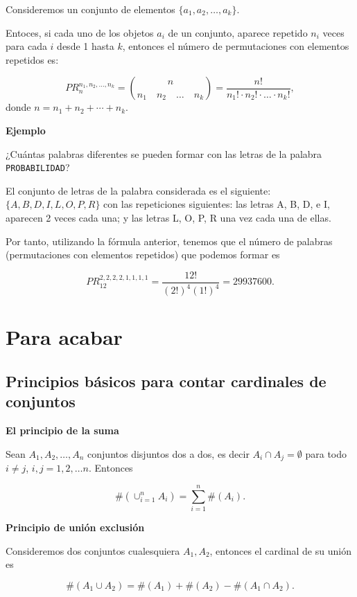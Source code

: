 \documentclass[
  letterpaper,
  DIV=11,
  numbers=noendperiod]{scrreprt}
\begin{document}
Consideremos un conjunto de elementos \(\{a_1, a_2, \ldots, a_k\}\).

Entoces, si cada uno de los objetos \(a_i\) de un conjunto, aparece
repetido \(n_i\) veces para cada \(i\) desde 1 hasta \(k\), entonces el
número de permutaciones con elementos repetidos es:

\[PR_n^{n_1,n_2,\ldots,n_k} = {{n}\choose {n_1\quad n_2 \quad\ldots \quad n_k}}=\frac{n!}{n_1!\cdot n_2!\cdot \ldots \cdot n_k!},\]
donde \(n=n_1+n_2+\cdots+n_k\).

\textbf{Ejemplo}

¿Cuántas palabras diferentes se pueden formar con las letras de la
palabra \texttt{PROBABILIDAD}?

El conjunto de letras de la palabra considerada es el siguiente:
\(\{A, B, D, I, L, O, P, R\}\) con las repeticiones siguientes: las
letras A, B, D, e I, aparecen 2 veces cada una; y las letras L, O, P, R
una vez cada una de ellas.

Por tanto, utilizando la fórmula anterior, tenemos que el número de
palabras (permutaciones con elementos repetidos) que podemos formar es

\[PR^{2,2,2,2,1,1,1,1}_{12} = \frac{12!}{(2!)^4(1!)^4} = 29937600.\]

\hypertarget{para-acabar}{%
\section{Para acabar}\label{para-acabar}}

\hypertarget{principios-buxe1sicos-para-contar-cardinales-de-conjuntos}{%
\subsection{Principios básicos para contar cardinales de
conjuntos}\label{principios-buxe1sicos-para-contar-cardinales-de-conjuntos}}

\textbf{El principio de la suma}

Sean \(A_1, A_2,\ldots, A_n\) conjuntos disjuntos dos a dos, es decir
\(A_i\cap A_j=\emptyset\) para todo \(i\not= j\), \(i,j=1,2,\ldots n\).
Entonces

\[\#(\cup_{i=1}^n A_i)=\sum_{i=1}^n \#(A_i).\]

\textbf{Principio de unión exclusión}

Consideremos dos conjuntos cualesquiera \(A_1, A_2\), entonces el
cardinal de su unión es

\[\#(A_1\cup A_2)=\#(A_1)+\#(A_2)-\#(A_1\cap A_2).\]
\end{document}
